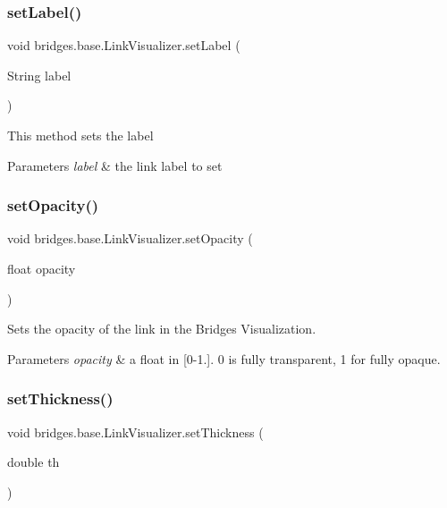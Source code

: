 \subsubsection{\texorpdfstring{set\+Label()}{setLabel()}}
{\footnotesize\ttfamily void bridges.\+base.\+Link\+Visualizer.\+set\+Label (\begin{DoxyParamCaption}\item[{String}]{label }\end{DoxyParamCaption})}

This method sets the label


\begin{DoxyParams}{Parameters}
{\em label} & the link label to set \\
\hline
\end{DoxyParams}
\mbox{\label{classbridges_1_1base_1_1_link_visualizer_ac0d59614dbc65ed0a19c25c493a1deaa}} 
\subsubsection{\texorpdfstring{set\+Opacity()}{setOpacity()}}
{\footnotesize\ttfamily void bridges.\+base.\+Link\+Visualizer.\+set\+Opacity (\begin{DoxyParamCaption}\item[{float}]{opacity }\end{DoxyParamCaption})}



Sets the opacity of the link in the Bridges Visualization. 


\begin{DoxyParams}{Parameters}
{\em opacity} & a float in \mbox{[}0-\/1.\mbox{]}. 0 is fully transparent, 1 for fully opaque. \\
\hline
\end{DoxyParams}
\mbox{\label{classbridges_1_1base_1_1_link_visualizer_a702e9ca345d1a4a035baf2041f275849}} 
\subsubsection{\texorpdfstring{set\+Thickness()}{setThickness()}}
{\footnotesize\ttfamily void bridges.\+base.\+Link\+Visualizer.\+set\+Thickness (\begin{DoxyParamCaption}\item[{double}]{th }\end{DoxyParamCaption})}



